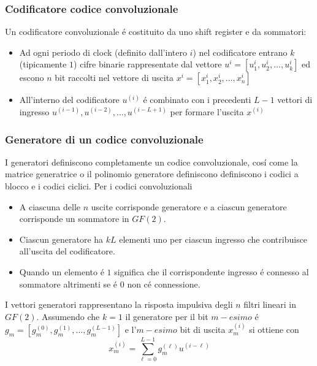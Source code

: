         \subsubsection{Codificatore codice convoluzionale}
            Un codificatore convoluzionale é costituito da uno shift register e da sommatori: 
            \begin{itemize}
                \item {
                    \begin{sloppypar}
                        Ad ogni periodo di clock (definito dall'intero $i$) nel codificatore entrano $k$ (tipicamente $1$) cifre binarie 
                        rappresentate dal vettore ${u^{i} = [u^{i}_1,u^{i}_2,\dots,u^{i}_k]}$ ed escono $n$ bit raccolti nel vettore di uscita
                        ${x^{i} = [x^{i}_1,x^{i}_2,\dots,x^{i}_n]}$
                    \end{sloppypar}
                }
                \item {
                    All'interno del codificatore $u^{(i)}$ é combinato con i precedenti $L-1$ vettori di ingresso $u^{(i-1)},u^{(i-2)},\dots,u^{(i-L+1)}$
                    per formare l'uscita $x^{(i)}$
                }
            \end{itemize}
        \subsubsection{Generatore di un codice convoluzionale}
            I generatori definiscono completamente un codice convoluzionale, cosí come la matrice generatrice o il polinomio generatore definiscono
            definiscono i codici a blocco e i codici ciclici. Per i codici convoluzionali 
            \begin{itemize}
                \item {
                    A ciascuna delle $n$ uscite corrisponde generatore e a ciascun generatore corrisponde un sommatore in $GF(2)$.
                }
                \item {
                    Ciascun generatore ha $kL$ elementi uno per ciascun ingresso che contribuisce all'uscita del codificatore.
                }
                \item {
                    Quando un elemento é $1$ significa che il corrispondente ingresso é connesso al sommatore altrimenti se é $0$
                    non cé connessione.
                }
            \end{itemize}
            I vettori generatori rappresentano la risposta impulsiva degli $n$ filtri lineari in $GF(2)$. Assumendo che $k=1$ il 
            generatore per il bit $m-esimo$ é $g_m = [g^{(0)}_m,g^{(1)}_m,\dots,g^{(L-1)}_m]$ e l'$m-esimo$ bit di uscita $x^{(i)}_m$ 
            si ottiene con 
            \[
                x_m^{(i)} = \sum_{\ell = 0}^{L-1} g_m^{(\ell)}u^{(i-\ell)}  
            \]
